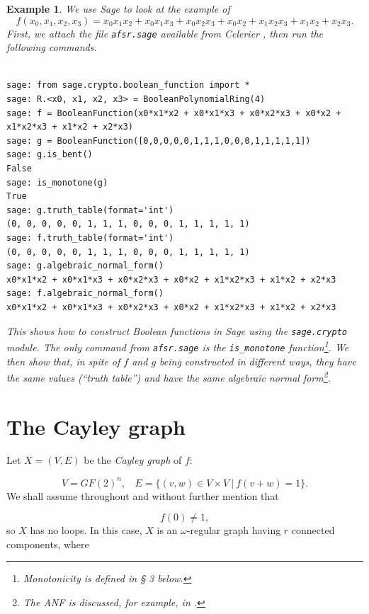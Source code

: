 \documentclass[12pt]{article}
\newcommand{\dgreen}{\color{dgreencolor}\bf}
\newcommand{\SAGE}{{\dgreen {\sf Sage}}\xspace}
\newcommand{\sage}{\SAGE}
\newtheorem{example}[theorem]{Example}
\begin{document}
\begin{example}
We use Sage to look at the example of
\[
f(x_0,x_1,x_2,x_3) = x_0x_1x_2 + x_0x_1x_3 + x_0x_2x_3 + x_0x_2 +
x_1x_2x_3 + x_1x_2 + x_2x_3.
\]
First, we attach the file {\tt afsr.sage} available from Celerier
\cite{url:c12},
then run the following commands.


\begin{Verbatim}[fontsize=\scriptsize,fontfamily=courier,fontshape=tt,frame=single,label=\sage]

sage: from sage.crypto.boolean_function import *
sage: R.<x0, x1, x2, x3> = BooleanPolynomialRing(4)
sage: f = BooleanFunction(x0*x1*x2 + x0*x1*x3 + x0*x2*x3 + x0*x2 +
x1*x2*x3 + x1*x2 + x2*x3)
sage: g = BooleanFunction([0,0,0,0,0,1,1,1,0,0,0,1,1,1,1,1])
sage: g.is_bent()
False
sage: is_monotone(g)
True
sage: g.truth_table(format='int')
(0, 0, 0, 0, 0, 1, 1, 1, 0, 0, 0, 1, 1, 1, 1, 1)
sage: f.truth_table(format='int')
(0, 0, 0, 0, 0, 1, 1, 1, 0, 0, 0, 1, 1, 1, 1, 1)
sage: g.algebraic_normal_form()
x0*x1*x2 + x0*x1*x3 + x0*x2*x3 + x0*x2 + x1*x2*x3 + x1*x2 + x2*x3
sage: f.algebraic_normal_form()
x0*x1*x2 + x0*x1*x3 + x0*x2*x3 + x0*x2 + x1*x2*x3 + x1*x2 + x2*x3

\end{Verbatim}

\noindent
This shows how to construct Boolean functions in Sage using
the {\tt sage.crypto} module. The only command from {\tt afsr.sage} is
the {\tt is\_monotone} function\footnote{Monotonicity is defined in \S
  3 below.}. We then show that, in spite of $f$ and
$g$ being constructed in different ways, they have the same values
(``truth table'') and have the same algebraic normal form\footnote{The
  ANF is discussed, for example, in \cite{thesis:c12}.}.

\end{example}



\section{The Cayley graph}

Let $X=(V,E)$ be the {\it Cayley graph} of $f$:

\[
V = GF(2)^n,\ \ \ \ E = \{(v,w)\in V\times V\ |\ f(v+w)=1\}.
\]
We shall assume throughout and without further mention that

\[
f(0)\not=1,
\]
so $X$ has no loops.
In this case, $X$ is an $\omega$-regular graph having $r$ connected
components, where
\end{document}
